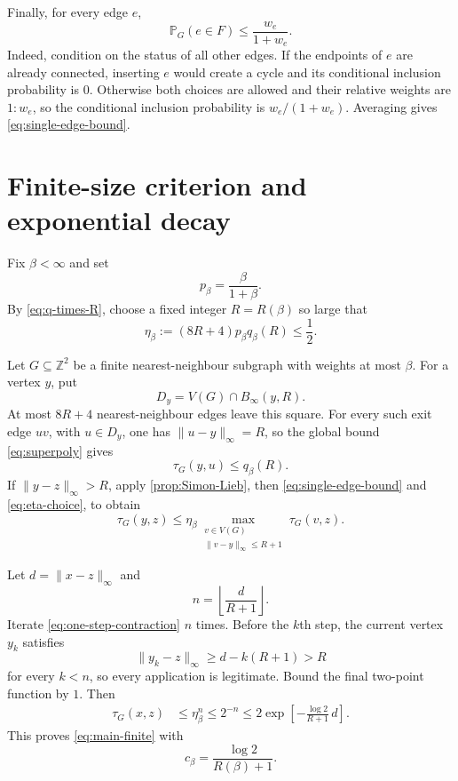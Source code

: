 \documentclass[11pt]{article}
\theoremstyle{definition}
\theoremstyle{remark}
\newcommand{\PP}{\mathbb P}
\newcommand{\ZZ}{\mathbb Z}
\newcommand{\1}{\mathbf 1}
\begin{document}
Finally, for every edge $e$,
\begin{equation}\label{eq:single-edge-bound}
 \PP_G(e\in F)\le\frac{w_e}{1+w_e}.
\end{equation}
Indeed, condition on the status of all other edges.  If the endpoints of $e$ are
already connected, inserting $e$ would create a cycle and its conditional inclusion
probability is $0$.  Otherwise both choices are allowed and their relative weights are
$1:w_e$, so the conditional inclusion probability is $w_e/(1+w_e)$.  Averaging gives
\eqref{eq:single-edge-bound}.

\section{Finite-size criterion and exponential decay}\label{sec:exp}

Fix $\beta<\infty$ and set
\begin{equation}
 p_\beta=\frac{\beta}{1+\beta}.
\end{equation}
By \eqref{eq:q-times-R}, choose a fixed integer $R=R(\beta)$ so large that
\begin{equation}\label{eq:eta-choice}
 \eta_\beta:=(8R+4)p_\beta q_\beta(R)\le\frac12.
\end{equation}

Let $G\subseteq\ZZ^2$ be a finite nearest-neighbour subgraph with weights at most
$\beta$.  For a vertex $y$, put
\begin{equation}
 D_y=V(G)\cap B_\infty(y,R).
\end{equation}
At most $8R+4$ nearest-neighbour edges leave this square.  For every such exit edge
$uv$, with $u\in D_y$, one has $\|u-y\|_\infty=R$, so the global bound
\eqref{eq:superpoly} gives
\begin{equation}
 \tau_G(y,u)\le q_\beta(R).
\end{equation}
If $\|y-z\|_\infty>R$, apply \cref{prop:Simon-Lieb}, then
\eqref{eq:single-edge-bound} and \eqref{eq:eta-choice}, to obtain
\begin{equation}\label{eq:one-step-contraction}
 \tau_G(y,z)
 \le\eta_\beta
 \max_{\substack{v\in V(G)\\\|v-y\|_\infty\le R+1}}
 \tau_G(v,z).
\end{equation}

Let $d=\|x-z\|_\infty$ and
\begin{equation}
 n=\left\lfloor\frac{d}{R+1}\right\rfloor.
\end{equation}
Iterate \eqref{eq:one-step-contraction} $n$ times.  Before the $k$th step, the current
vertex $y_k$ satisfies
\begin{equation}
 \|y_k-z\|_\infty\ge d-k(R+1)>R
\end{equation}
for every $k<n$, so every application is legitimate.  Bound the final two-point
function by $1$.  Then
\begin{align}
 \tau_G(x,z)
 &\le\eta_\beta^n
 \le2^{-n}
 \le2\exp\left[-\frac{\log2}{R+1}\,d\right].
 \label{eq:exp-final}
\end{align}
This proves \eqref{eq:main-finite} with
\begin{equation}
 c_\beta=\frac{\log2}{R(\beta)+1}.
\end{equation}
\end{document}

